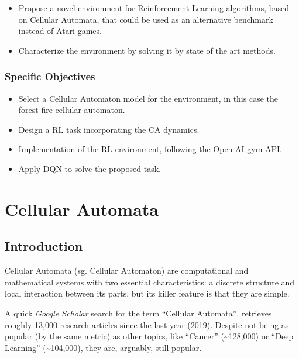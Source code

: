 \documentclass[
]{book}
\providecommand{\tightlist}{%
  \setlength{\itemsep}{0pt}\setlength{\parskip}{0pt}}
\begin{document}
\begin{itemize}
\tightlist
\item
  Propose a novel environment for Reinforcement Learning algorithms, based on Cellular Automata, that could be used as an alternative benchmark instead of Atari games.
\item
  Characterize the environment by solving it by state of the art methods.
\end{itemize}

\hypertarget{specific-objectives}{%
\subsection{Specific Objectives}\label{specific-objectives}}

\begin{itemize}
\tightlist
\item
  Select a Cellular Automaton model for the environment, in this case the forest fire cellular automaton.
\item
  Design a RL task incorporating the CA dynamics.
\item
  Implementation of the RL environment, following the Open AI gym API.
\item
  Apply DQN to solve the proposed task.
\end{itemize}

\hypertarget{cellular-automata}{%
\chapter{Cellular Automata}\label{cellular-automata}}

\hypertarget{introduction-1}{%
\section{Introduction}\label{introduction-1}}

Cellular Automata (sg. Cellular Automaton) are computational and mathematical systems with two essential characteristics: a discrete structure and local interaction between its parts, but its killer feature is that they are simple.

A quick \emph{Google Scholar} search for the term ``Cellular Automata'', retrieves roughly 13,000 research articles since the last year (2019). Despite not being as popular (by the same metric) as other topics, like ``Cancer'' (\textasciitilde128,000) or ``Deep Learning'' (\textasciitilde104,000), they are, arguably, still popular.
\end{document}
